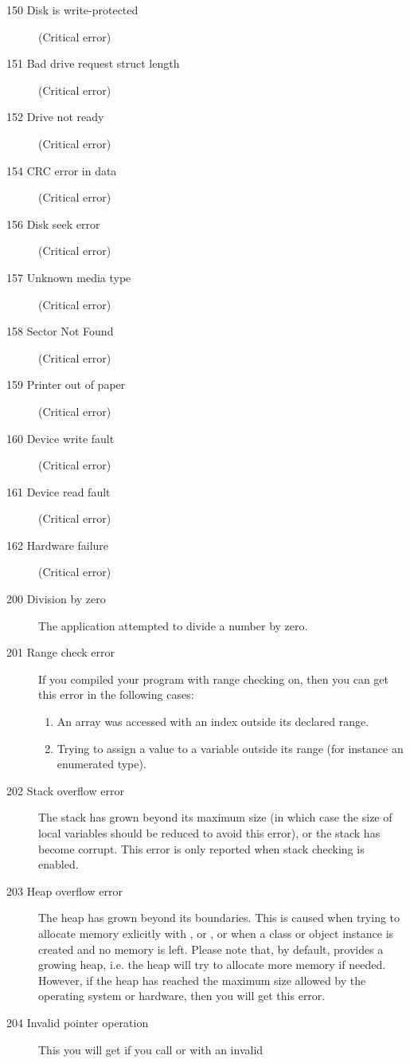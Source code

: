 \begin{description}
\item [150  Disk is write-protected]
(Critical error)
\item [151  Bad drive request struct length]
(Critical error)
\item [152  Drive not ready]
(Critical error)
\item [154  CRC error in data]
(Critical error)
\item [156  Disk seek error]
(Critical error)
\item [157  Unknown media type]
(Critical error)
\item [158  Sector Not Found]
(Critical error)
\item [159  Printer out of paper]
(Critical error)
\item [160  Device write fault]
(Critical error)
\item [161  Device read fault]
(Critical error)
\item [162  Hardware failure]
(Critical error)
\item [200  Division by zero]
The application attempted to divide a number by zero.
\item [201  Range check error]
If you compiled your program with range checking on, then you can get this
error in the following cases:
\begin{enumerate}
\item An array was accessed with an index outside its declared range.
\item Trying to assign a value to a variable outside its range (for
instance an enumerated type).
\end{enumerate}
\item [202  Stack overflow error]
The stack has grown beyond its maximum size (in which case the size of 
local variables should be reduced to avoid this error), or the stack has 
become corrupt. This error is only reported when stack checking is enabled.
\item [203  Heap overflow error]
The heap has grown beyond its boundaries. This is caused when trying to allocate
memory exlicitly with ,  or , or when
a class or object instance is created and no memory is left. Please note 
that, by default, \fpc provides a growing heap, i.e. the heap will
try to allocate more memory if needed. However, if the heap has reached the
maximum size allowed by the operating system or hardware, then you will get
this error.
\item [204  Invalid pointer operation]
This you will get if you call  or  with an invalid 

\end{description}
